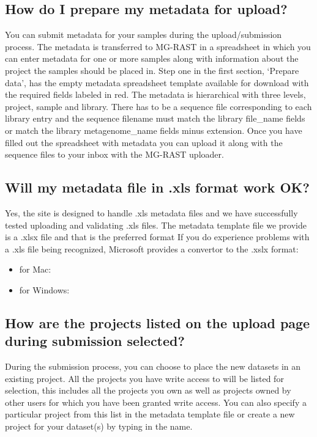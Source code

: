 \documentclass[letterpaper,10pt,english]{sphinxmanual}
\begin{document}
\subsection{How do I prepare my metadata for upload?}
\label{\detokenize{user_manual:how-do-i-prepare-my-metadata-for-upload}}
You can submit metadata for your samples during the upload/submission
process. The metadata is transferred to MG-RAST in a spreadsheet in
which you can enter metadata for one or more samples along with
information about the project the samples should be placed in. Step one
in the first section, ‘Prepare data’, has the empty metadata spreadsheet
template available for download with the required fields labeled in red.
The metadata is hierarchical with three levels, project, sample and
library. There has to be a sequence file corresponding to each library
entry and the sequence filename must match the library file\_name fields
or match the library metagenome\_name fields minus extension. Once you
have filled out the spreadsheet with metadata you can upload it along
with the sequence files to your inbox with the MG-RAST uploader.


\subsection{Will my metadata file in .xls format work OK?}
\label{\detokenize{user_manual:will-my-metadata-file-in-xls-format-work-ok}}
Yes, the site is designed to handle .xls metadata files and we have
successfully tested uploading and validating .xls files. The metadata
template file we provide is a .xlsx file and that is the preferred
format If you do experience problems with a .xls file being recognized,
Microsoft provides a convertor to the .xslx format:
\begin{itemize}
\item {} 
for Mac:


\item {} 
for Windows:


\end{itemize}


\subsection{How are the projects listed on the upload page during submission selected?}
\label{\detokenize{user_manual:how-are-the-projects-listed-on-the-upload-page-during-submission-selected}}
During the submission process, you can choose to place the new datasets
in an existing project. All the projects you have write access to will
be listed for selection, this includes all the projects you own as well
as projects owned by other users for which you have been granted write
access. You can also specify a particular project from this list in the
metadata template file or create a new project for your dataset(s) by
typing in the name.
\end{document}
